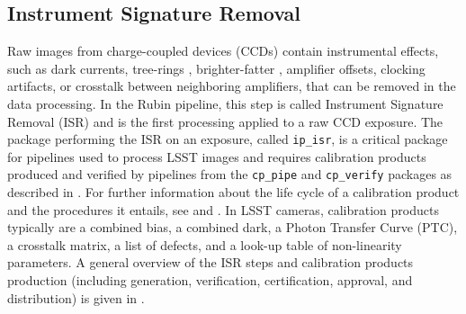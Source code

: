 \subsection{Instrument Signature Removal}
\label{sec:isr}

Raw images from charge-coupled devices (CCDs) contain instrumental effects, such as dark currents, tree-rings \citep{2020JATIS...6a1005P}, brighter-fatter \citep{2024PASP..136d5003B}, amplifier offsets, clocking artifacts, or crosstalk between neighboring amplifiers, that can be removed in the data processing.
In the Rubin pipeline, this step is called Instrument Signature Removal (ISR) and is the first processing applied to a raw CCD exposure.
The package performing the ISR on an exposure, called \texttt{ip\_isr}, is a critical package for pipelines used to process LSST images and requires calibration products produced and verified by pipelines from the \texttt{cp\_pipe} and \texttt{cp\_verify} packages as described in .
For further information about the life cycle of a calibration product and the procedures it entails, see \citet{DMTN-222} and \citet{SITCOMTN-086}.
In LSST cameras, calibration products typically are a combined bias, a combined dark, a Photon Transfer Curve (PTC), a crosstalk matrix, a list of defects, and a look-up table of non-linearity parameters.
A general overview of the ISR steps and calibration products production (including generation, verification, certification, approval, and distribution) is given in \citet{2025JATIS..11a1209P}.
